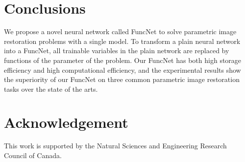 \documentclass{article}
\begin{document}
\section{Conclusions}
\label{sec:5}

We propose a novel neural network called FuncNet to solve parametric image restoration problems with a single model. To transform a plain neural network into a FuncNet, all trainable variables in the plain network are replaced by functions of the parameter of the problem. Our FuncNet has both high storage efficiency and high computational efficiency, and the experimental results show the superiority of our FuncNet on three common parametric image restoration tasks over the state of the arts.

\section*{Acknowledgement}

This work is supported by the Natural Sciences and Engineering Research Council of Canada.

{\small


}
\end{document}
